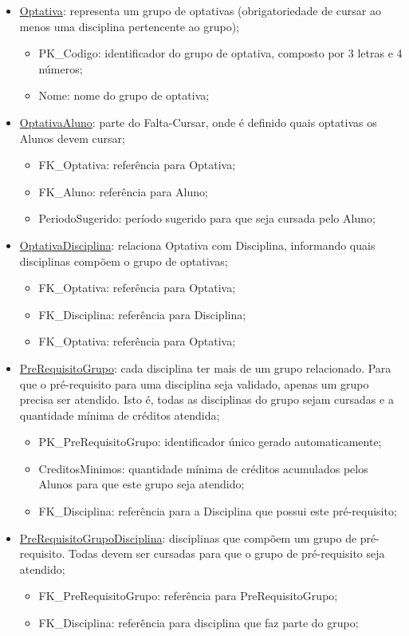 \documentclass[graduacao,brazil]{ThesisPUC}
\begin{document}
\begin{itemize}
	\item \underline{Optativa}: representa um grupo de optativas (obrigatoriedade de cursar ao menos uma disciplina pertencente ao grupo);
	\begin{itemize}
		\item PK\_Codigo: identificador do grupo de optativa, composto por 3 letras e 4 números;
		\item Nome: nome do grupo de optativa;
	\end{itemize}

	\item \underline{OptativaAluno}: parte do Falta-Cursar, onde é definido quais optativas os Alunos devem cursar;
	\begin{itemize}
		\item FK\_Optativa: referência para Optativa;
		\item FK\_Aluno: referência para Aluno;
		\item PeriodoSugerido: período sugerido para que seja cursada pelo Aluno;
	\end{itemize}

	\item \underline{OptativaDisciplina}: relaciona Optativa com Disciplina, informando quais disciplinas compõem o grupo de optativas;
	\begin{itemize}
		\item FK\_Optativa: referência para Optativa;
		\item FK\_Disciplina: referência para Disciplina;
		\item FK\_Optativa: referência para Optativa;
	\end{itemize}

	\item \underline{PreRequisitoGrupo}: cada disciplina ter mais de um grupo relacionado. Para que o pré-requisito para uma disciplina seja validado, apenas um grupo precisa ser atendido. Isto é, todas as disciplinas do grupo sejam cursadas e a quantidade mínima de créditos atendida;
	\begin{itemize}
		\item PK\_PreRequisitoGrupo: identificador único gerado automaticamente;
		\item CreditosMinimos: quantidade mínima de créditos acumulados pelos Alunos para que este grupo seja atendido;
		\item FK\_Disciplina: referência para a Disciplina que possui este pré-requisito;
	\end{itemize}

	\item \underline{PreRequisitoGrupoDisciplina}: disciplinas que compõem um grupo de pré-requisito. Todas devem ser cursadas para que o grupo de pré-requisito seja atendido;
	\begin{itemize}
		\item FK\_PreRequisitoGrupo: referência para PreRequisitoGrupo;
		\item FK\_Disciplina: referência para disciplina que faz parte do grupo;
	\end{itemize}


\end{itemize}
\end{document}
